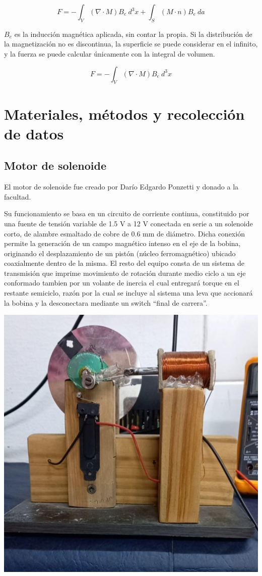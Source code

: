 \documentclass[a4paper,12pt]{article}
\newenvironment{Figure}
    {\par\medskip\noindent\minipage{\linewidth}}
    {\endminipage\par\medskip}
\begin{document}
        \begin{equation}
            \label{eq: fuerzaMagnetica}
            F = - \int_{V}^{} (\nabla \cdot M) B_e \ d^3 x + \int_{S}^{} (M \cdot n) B_e \ da
        \end{equation}

        $B_e$ es la inducción magnética aplicada, sin contar la propia. Si la distribución de la magnetización no es discontinua, la superficie se puede considerar en el infinito, y la fuerza se puede calcular únicamente con la integral de volumen.

        \begin{equation}
            \label{eq: fuerzaMagneticaReducida}
            F = - \int_{V}^{} (\nabla \cdot M) B_e \ d^3 x
        \end{equation}

\section*{Materiales, métodos y recolección de datos}

    \subsection*{Motor de solenoide}

        El motor de solenoide fue creado por Darío Edgardo Ponzetti y donado a la facultad.

        Su funcionamiento se basa en un circuito de corriente continua, constituido por una fuente de tensión variable de 1.5 V a 12 V conectada en serie a un solenoide corto, de alambre esmaltado de cobre de 0.6 mm de diámetro. Dicha conexión permite la generación de un campo magnético intenso en el eje de la bobina, originando el desplazamiento de un pistón (núcleo ferromagnético) ubicado coaxialmente dentro de la misma. El resto del equipo consta de un sistema de transmisión que imprime movimiento de rotación durante medio ciclo a un eje conformado tambien por un volante de inercia el cual entregará torque en el restante semiciclo, razón por la cual se incluye al sistema una leva que accionará la bobina y la desconectara mediante un switch “final de carrera”.

        \begin{Figure}
            \centering
            \includegraphics[width=0.4\linewidth]{motorSolenoide_frente.jpg}
            \label{fig: motorSolenoide_frente}
        \end{Figure}
        
\end{document}
